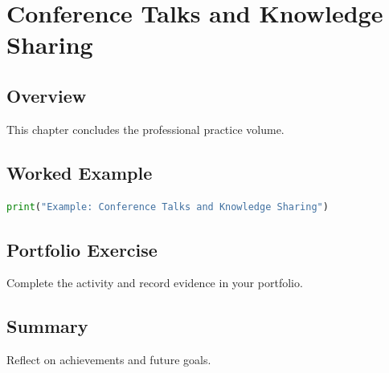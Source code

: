\chapter{Conference Talks and Knowledge Sharing}
\label{chap:vol15-7}



\section{Overview}
This chapter concludes the professional practice volume.

\section{Worked Example}
\begin{lstlisting}[language=Python]
print("Example: Conference Talks and Knowledge Sharing")
\end{lstlisting}

\section{Portfolio Exercise}
Complete the activity and record evidence in your portfolio.

\section{Summary}
Reflect on achievements and future goals.
